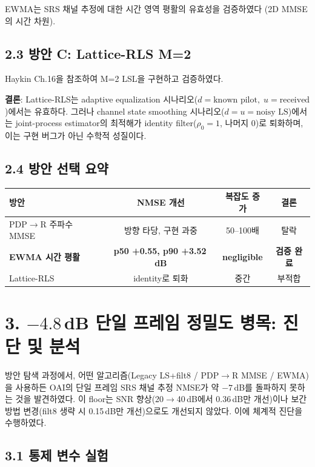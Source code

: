 \documentclass[11pt,a4paper]{article}
\begin{document}
EWMA는 SRS 채널 추정에 대한 시간 영역 평활의 유효성을 검증하였다 (2D MMSE의 시간 차원).

\subsection{2.3 방안 C: Lattice-RLS M=2}

Haykin Ch.16을 참조하여 M=2 LSL을 구현하고 검증하였다.

\textbf{결론}: Lattice-RLS는 adaptive equalization 시나리오($d = \text{known pilot},\; u = \text{received}$)에서는 유효하다. 그러나 channel state smoothing 시나리오($d = u = \text{noisy LS}$)에서는 joint-process estimator의 최적해가 identity filter($\rho_0=1$, 나머지 0)로 퇴화하며, 이는 구현 버그가 아닌 수학적 성질이다.

\subsection{2.4 방안 선택 요약}

\begin{table}[h]\centering
\begin{tabular}{lccc}
\toprule
방안 & NMSE 개선 & 복잡도 증가 & 결론 \\
\midrule
PDP$\to$R 주파수 MMSE & 방향 타당, 구현 과중 & 50--100배 & 탈락 \\
\textbf{EWMA 시간 평활} & \textbf{p50 +0.55, p90 +3.52\,dB} & \textbf{negligible} & \textbf{검증 완료} \\
Lattice-RLS & identity로 퇴화 & 중간 & 부적합 \\
\bottomrule
\end{tabular}
\end{table}

\section{3. $-4.8$\,dB 단일 프레임 정밀도 병목: 진단 및 분석}

방안 탐색 과정에서, 어떤 알고리즘(Legacy LS+filt8 / PDP$\to$R MMSE / EWMA)을 사용하든 OAI의 단일 프레임 SRS 채널 추정 NMSE가 약 $-7$\,dB를 돌파하지 못하는 것을 발견하였다. 이 floor는 SNR 향상(20$\to$40\,dB에서 0.36\,dB만 개선)이나 보간 방법 변경(filt8 생략 시 0.15\,dB만 개선)으로도 개선되지 않았다. 이에 체계적 진단을 수행하였다.

\subsection{3.1 통제 변수 실험}
\end{document}
